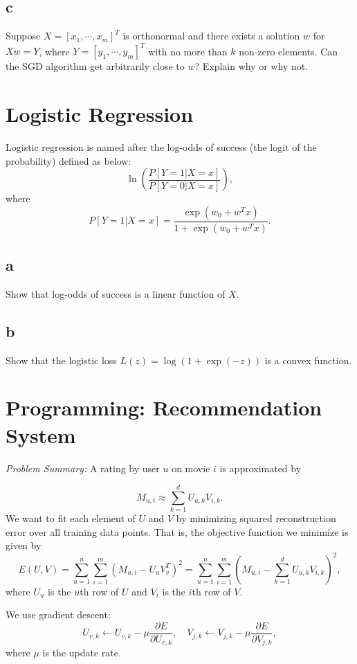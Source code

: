\documentclass{article}
\begin{document}
\subsection{c}
Suppose $X = [x_1, \cdots, x_m]^T$ is orthonormal and there exists a solution $w$ for $Xw = Y$, where $Y = [y_1, \cdots, y_m]^T$ with no more than $k$ non-zero elements.
Can the SGD algorithm get arbitrarily close to $w$?
Explain why or why not.

\section{Logistic Regression}
Logistic regression is named after the log-odds of success (the logit of the probability) defined as below:
$$\ln\left(\frac{P[Y=1|X=x]}{P[Y=0|X=x]}\right),$$
where
$$P[Y=1|X=x] = \frac{\exp(w_0 + w^Tx)}{1 + \exp(w_0 + w^Tx)}.$$

\subsection{a}
Show that log-odds of success is a linear function of $X$.

\subsection{b}
Show that the logistic loss $L(z) = \log(1 + \exp(-z))$ is a convex function.

\section{Programming: Recommendation System}

\emph{Problem Summary:}
A rating by user $u$ on movie $i$ is approximated by

\begin{equation} \label{eq:5}
M_{u,i} \approx \sum_{k=1}^{d}{U_{u,k}V_{i,k}}.
\end{equation}
We want to fit each element of $U$ and $V$ by minimizing squared reconstruction error over all training data points.
That is, the objective function we minimize is given by
\begin{equation} \label{eq:6}
E(U,V) = \sum_{u=1}^n\sum_{i=1}^m{(M_{u,i} - U_uV_v^T)^2} = \sum_{u=1}^n\sum_{i=1}^m{(M_{u,i} - \sum_{k=1}^d{U_{u,k}V_{i,k}})^2},
\end{equation}
where $U_u$ is the $u$th row of $U$ and $V_i$ is the $i$th row of $V$.

We use gradient descent:
\begin{equation} \label{eq:8}
    U_{v,k} \leftarrow U_{v,k} - \mu \frac{\partial E}{\partial U_{v,k}}, \quad V_{j,k} \leftarrow V_{j,k} - \mu \frac{\partial E}{\partial V_{j,k}},
\end{equation}
where $\mu$ is the update rate.
\end{document}
